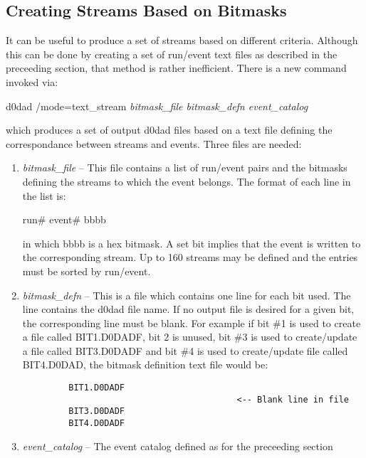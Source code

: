 \subsection{Creating Streams Based on Bitmasks \label{ss-ug-tstream}}
\par
It can be useful to produce a set of streams based on different criteria.  
Although this can be done by creating a set of run/event text files as described
in the preceeding section, that method is rather inefficient.  There is a new
command invoked via: \\
\centerline{d0dad /mode=text\_stream \it 
  bitmask\_file bitmask\_defn event\_catalog}
which produces a set of output d0dad files based on a text file
defining the correspondance between streams and events. Three files are needed:
\begin{enumerate}
\item {\it bitmask\_file} -- This file contains a list of run/event pairs and 
  the bitmasks defining the streams to which the event belongs.  The format of
  each line in the list is: \
  
  \centerline{         run\# event\# bbbb}

  in which bbbb is a hex bitmask.  A  set bit implies that the event is written
  to the corresponding stream.  Up to 160 streams may be defined and the entries
  must be sorted by run/event. 


\item {\it bitmask\_defn} -- This is a file which contains one line for each bit
  used.  The line contains the d0dad file name.  If no output file is desired
  for a given bit, the corresponding line must be blank.  For example if
  bit \#1 is used to create a file called BIT1.D0DADF, bit 2 is unused, bit \#3
  is used to create/update a file called BIT3.D0DADF and bit \#4 is used to
  create/update file called BIT4.D0DAD, the bitmask definition text
  file would be:
\begin{verbatim}
         BIT1.D0DADF
                                          <-- Blank line in file
         BIT3.D0DADF
         BIT4.D0DADF
\end{verbatim}

\item {\it event\_catalog} --  The event catalog defined as for the preceeding
  section
\end{enumerate}

